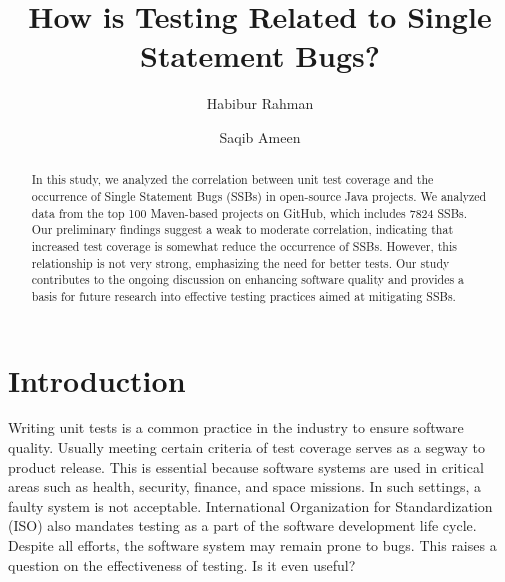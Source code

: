 \documentclass[sigconf,nonacm]{acmart}
\begin{document}
\title{How is Testing Related to Single Statement Bugs?}

\author{Habibur Rahman}

\author{Saqib Ameen}
\authornotemark[1]
\authornotemark[2]




\begin{abstract}
	In this study, we analyzed the correlation between unit test coverage and the occurrence of Single Statement Bugs (SSBs) in open-source Java projects. We analyzed data from the top 100 Maven-based projects on GitHub, which includes 7824 SSBs. Our preliminary findings suggest a weak to moderate correlation, indicating that increased test coverage is somewhat reduce the occurrence of SSBs. However, this relationship is not very strong, emphasizing the need for better tests. Our study contributes to the ongoing discussion on enhancing software quality and provides a basis for future research into effective testing practices aimed at mitigating SSBs.
	\end{abstract}	


\maketitle
{}
\section{Introduction}
Writing unit tests is a common practice in the industry to ensure software quality. Usually meeting certain criteria of test coverage serves as a segway to product release. This is essential because software systems are used in critical areas such as health, security, finance, and space missions. In such settings, a faulty system is not acceptable. International Organization for Standardization (ISO) also mandates testing as a part of the software development life cycle. Despite all efforts, the software system may remain prone to bugs. This raises a question on the effectiveness of testing. Is it even useful?
\end{document}
